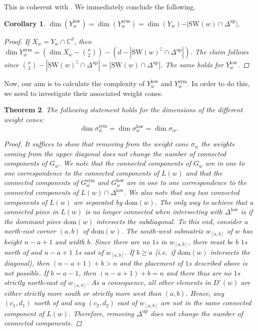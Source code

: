 \documentclass[11pt]{amsart}
\newtheorem{theorem}{Theorem}[section]
\newtheorem{corollary}[theorem]{Corollary}
\theoremstyle{definition}
\theoremstyle{definition}
\theoremstyle{definition}
\theoremstyle{definition}
\newcommand{\SW}{\mathrm{SW}}
\newcommand{\dom}{\mathrm{dom}}
\newcommand{\Dc}{D^{\circ}}
\newcommand{\sym}{\mathrm{sym}}
\newcommand{\low}{\mathrm{low}}
\begin{document}
\noindent This is coherent with \cite[Proposition 3.7]{fink2016matrix}. We immediately conclude the following.
\begin{corollary} 
 $\dim(Y^{\low}_w)=\dim(Y^{\sym}_w)=\dim(Y_w) - \vert \SW(w)\cap\Delta^{\textrm{up}}\vert$.
\begin{proof}
    If $\overline{X_w} = Y_w \cap \mathbb C^d$, then $\dim Y_w^{\sym} = (\dim \overline{X_w} - {n \choose 2}) - (d- |\SW(w)^{\complement} \cap \Delta^{\textrm{up}}|)$. The claim follows since $ {n \choose 2} -|\SW(w)^{\complement} \cap \Delta^{\textrm{up}}| = |\SW(w) \cap \Delta^{\textrm{up}}|$. The same holds for $Y_w^{\low}$.
\end{proof}
\end{corollary}

\noindent Now, our aim is to calculate the complexity of $Y^{\textrm{low}}_w$ and $Y^{\textrm{sym}}_w$. In order to do this, we need to investigate their associated weight cones. 

\begin{theorem}
     The following statement holds for the dimensions of the different weight cones: $$\dim \sigma^{\sym}_{w} = \dim \sigma^{\low}_{w} = \dim \sigma_{w}.$$
    \begin{proof}
        It suffices to show that removing from the weight cone $\sigma_w$ the weights coming from the upper diagonal does not change the number of connected components of $G_w$.
        We note that the connected components of $G_w$ are in one to one correspondence to the connected components of $L(w)$ and that the connected components of $G_w^{\sym}$ and $G_w^{\low}$ are in one to one correspondence to the connected components of $L(w)\cap \Delta^{\textrm{low}}$.  We also note that any two connected components of $L(w)$ are separated by $\dom(w)$. 
        The only way to achieve that a connected piece in $L(w)$ is no longer connected when intersecting with $\Delta^{\low}$ is if the dominant piece $\dom(w)$ intersects the subdiagonal.
        To this end, consider a north-east corner $(a,b)$ of $\dom(w)$. The south-west submatrix $w_{[a,b]}$ of $w$ has height $n-a+1$ and width $b$. Since there are no $1$s in $w_{[a,b]}$, there must be $b$ $1$s north of and $n-a+1$ $1$s east of $w_{[a,b]}$. If $b \geq a$ (i.e.\ if $\dom(w)$ intersects the diagonal), then $(n-a+1)+b >n$ and the placement of $1$s described above is not possible. If $b=a-1$, then $(n-a+1)+b =n$ and there thus are no $1$s strictly north-east of $w_{[a,b]}$. As a consequence, all other elements in $\Dc(w)$ are either strictly more south or strictly more west than $(a,b)$. Hence, any $(c_1,d_1)$ north of and any $(c_2,d_2)$ east of $w_{[a,b]}$ are not in the same connected component of $L(w)$. Therefore, removing $\Delta^{\textrm{up}}$ does not change the number of connected components.
    \end{proof}
    
\end{theorem}
\end{document}
